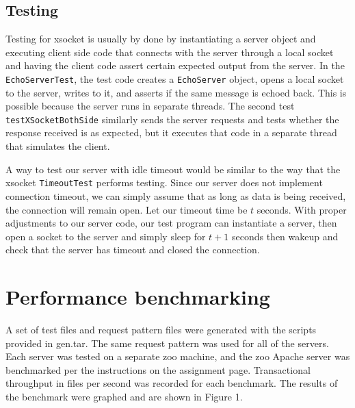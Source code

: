 \documentclass[letterpaper,12pt]{article}
\begin{document}
\subsection{Testing}

Testing for xsocket is usually by done by instantiating a server object and executing client side code that connects with the server through a local socket and having the client code assert certain expected output from the server. In the \texttt{EchoServerTest}, the test code creates a \texttt{EchoServer} object, opens a local socket to the server, writes to it, and asserts if the same message is echoed back. This is possible because the server runs in separate threads. The second test \texttt{testXSocketBothSide} similarly sends the server requests and tests whether the response received is as expected, but it executes that code in a separate thread that simulates the client.

A way to test our server with idle timeout would be similar to the way that the xsocket \texttt{TimeoutTest} performs testing. Since our server does not implement connection timeout, we can simply assume that as long as data is being received, the connection will remain open. Let our timeout time be $t$ seconds. With proper adjustments to our server code, our test program can instantiate a server, then open a socket to the server and simply sleep for $t + 1$ seconds then wakeup and check that the server has timeout and closed the connection.

\section{Performance benchmarking}

A set of test files and request pattern files were generated with the scripts provided in gen.tar. The same request pattern was used for all of the servers. Each server was tested on a separate zoo machine, and the zoo Apache server was benchmarked per the instructions on the assignment page. Transactional throughput in files per second was recorded for each benchmark. The results of the benchmark were graphed and are shown in Figure 1.
\end{document}
